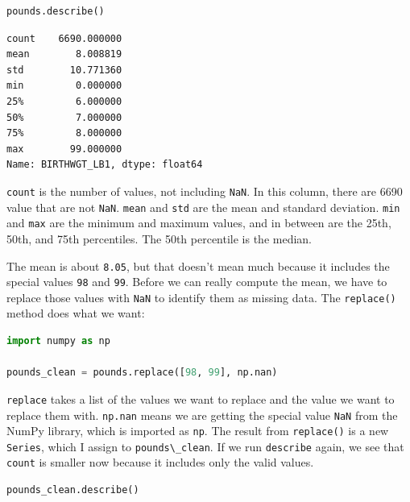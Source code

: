 \begin{lstlisting}[language=Python,style=source]
pounds.describe()
\end{lstlisting}

\begin{lstlisting}[style=output]
count    6690.000000
mean        8.008819
std        10.771360
min         0.000000
25%         6.000000
50%         7.000000
75%         8.000000
max        99.000000
Name: BIRTHWGT_LB1, dtype: float64
\end{lstlisting}

\passthrough{\lstinline!count!} is the number of values, not including
\passthrough{\lstinline!NaN!}. In this column, there are 6690 value that
are not \passthrough{\lstinline!NaN!}. \passthrough{\lstinline!mean!}
and \passthrough{\lstinline!std!} are the mean and standard deviation.
\passthrough{\lstinline!min!} and \passthrough{\lstinline!max!} are the
minimum and maximum values, and in between are the 25th, 50th, and 75th
percentiles. The 50th percentile is the median.

The mean is about \passthrough{\lstinline!8.05!}, but that doesn't mean
much because it includes the special values \passthrough{\lstinline!98!}
and \passthrough{\lstinline!99!}. Before we can really compute the mean,
we have to replace those values with \passthrough{\lstinline!NaN!} to
identify them as missing data. The \passthrough{\lstinline!replace()!}
method does what we want:

\begin{lstlisting}[language=Python,style=source]
import numpy as np

pounds_clean = pounds.replace([98, 99], np.nan)
\end{lstlisting}

\passthrough{\lstinline!replace!} takes a list of the values we want to
replace and the value we want to replace them with.
\passthrough{\lstinline!np.nan!} means we are getting the special value
\passthrough{\lstinline!NaN!} from the NumPy library, which is imported
as \passthrough{\lstinline!np!}. The result from
\passthrough{\lstinline!replace()!} is a new
\passthrough{\lstinline!Series!}, which I assign to
\passthrough{\lstinline!pounds\_clean!}. If we run
\passthrough{\lstinline!describe!} again, we see that
\passthrough{\lstinline!count!} is smaller now because it includes only
the valid values.

\begin{lstlisting}[language=Python,style=source]
pounds_clean.describe()
\end{lstlisting}


